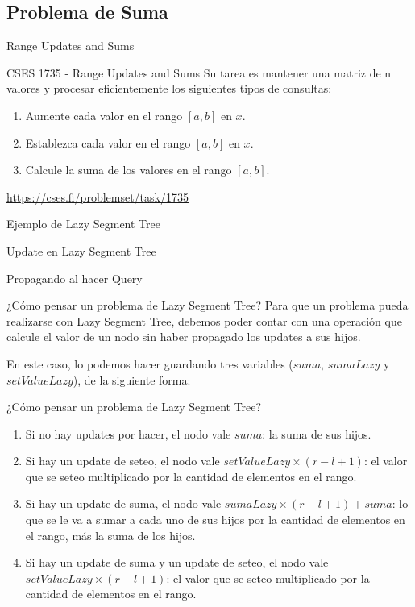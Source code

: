 \documentclass{beamer}
\begin{document}
\subsection{Problema de Suma}
\begin{frame}{Range Updates and Sums}
\begin{block}{CSES 1735 - Range Updates and Sums}
Su tarea es mantener una matriz de n valores y procesar eficientemente los siguientes tipos de consultas:
\begin{enumerate}
    \item Aumente cada valor en el rango $[a,b]$ en $x$.
    \item Establezca cada valor en el rango $[a,b]$ en $x$.
    \item Calcule la suma de los valores en el rango $[a,b]$.
\end{enumerate}
\end{block}

\url{https://cses.fi/problemset/task/1735}
\end{frame}

\begin{frame}{Ejemplo de Lazy Segment Tree}

\end{frame}

\begin{frame}{Update en Lazy Segment Tree}

\end{frame}

\begin{frame}{Propagando al hacer Query}

\end{frame}

\begin{frame}{¿Cómo pensar un problema de Lazy Segment Tree?}
Para que un problema pueda realizarse con Lazy Segment Tree, debemos poder contar con una operación que calcule el valor de un nodo sin haber propagado los updates a sus hijos.

En este caso, lo podemos hacer guardando tres variables ($suma$, $sumaLazy$ y $setValueLazy$), de la siguiente forma:
\end{frame}

\begin{frame}{¿Cómo pensar un problema de Lazy Segment Tree?}
\begin{enumerate}
    \item Si no hay updates por hacer, el nodo vale $suma$: la suma de sus hijos.
    \pause
    \item Si hay un update de seteo, el nodo vale $setValueLazy \times (r-l+1)$: el valor que se seteo multiplicado por la cantidad de elementos en el rango.
    \pause
    \item Si hay un update de suma, el nodo vale $sumaLazy \times (r-l+1) + suma$: lo que se le va a sumar a cada uno de sus hijos por la cantidad de elementos en el rango, más la suma de los hijos.
    \pause
    \item Si hay un update de suma y un update de seteo, el nodo vale $setValueLazy \times (r-l+1)$: el valor que se seteo multiplicado por la cantidad de elementos en el rango.
\end{enumerate}
\end{frame}
\end{document}
